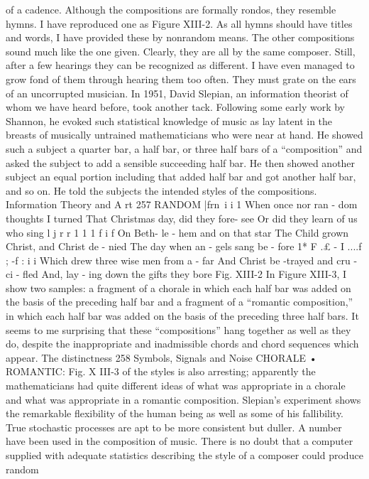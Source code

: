 {{{{{{{{{{{{of a cadence.
Although the compositions are formally rondos, they resemble
hymns. I have reproduced one as Figure XIII-2. As all hymns
should have titles and words, I have provided these by nonrandom
means. The other compositions sound much like the one given.
Clearly, they are all by the same composer. Still, after a few hearings
they can be recognized as different. I have even managed to
grow fond of them through hearing them too often. They must
grate on the ears of an uncorrupted musician.
In 1951, David Slepian, an information theorist of whom we
have heard before, took another tack. Following some early work
by Shannon, he evoked such statistical knowledge of music as lay
latent in the breasts of musically untrained mathematicians who
were near at hand. He showed such a subject a quarter bar, a half
bar, or three half bars of a “composition” and asked the subject
to add a sensible succeeding half bar. He then showed another
subject an equal portion including that added half bar and got
another half bar, and so on. He told the subjects the intended styles
of the compositions.
Information Theory and A rt 257
RANDOM
|frn~i i 1
When once nor ran - dom thoughts I turned
That Christmas day, did they fore- see Or did they learn of us who sing
l j r r 1 1 1 f i f
On Beth- le - hem and on that star
The Child grown Christ, and Christ de - nied
The day when an - gels sang be - fore
1* F .£ - I ....f ; -f : i i
Which drew three wise men from a - far
And Christ be -trayed and cru - ci - fled
And, lay - ing down the gifts they bore
Fig. XIII-2
In Figure XIII-3, I show two samples: a fragment of a chorale
in which each half bar was added on the basis of the preceding
half bar and a fragment of a “romantic composition,” in which
each half bar was added on the basis of the preceding three half
bars. It seems to me surprising that these “compositions” hang
together as well as they do, despite the inappropriate and inadmissible
chords and chord sequences which appear. The distinctness
258 Symbols, Signals and Noise
CHORALE •
ROMANTIC:
Fig. X III-3
of the styles is also arresting; apparently the mathematicians had
quite different ideas of what was appropriate in a chorale and
what was appropriate in a romantic composition.
Slepian’s experiment shows the remarkable flexibility of the
human being as well as some of his fallibility. True stochastic
processes are apt to be more consistent but duller. A number have
been used in the composition of music.
There is no doubt that a computer supplied with adequate
statistics describing the style of a composer could produce random
}}}}}}}}}}}}
